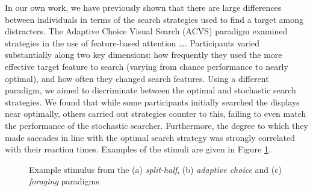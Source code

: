 \documentclass[]{rsos}%
\begin{document}
In our own work, we have previously shown that there are large differences between individuals in terms of the search strategies used to find a target among distracters. The Adaptive Choice Visual Search (ACVS) paradigm  \cite{irons-leber2016} examined strategies in the use of feature-based attention\cite{irons-leber2016,irons-leber2018} \ldots. Participants varied substantially along two key dimensions: how frequently they used the more effective target feature to search (varying from chance performance to nearly optimal), and how often they changed search features. Using a different paradigm\cite{nowakowsak2017}, we aimed to discriminate between the optimal  \cite{najemnik-geisler2008} and stochastic \cite{clarke2016} search strategies. We found that while some participants initially searched the displays near optimally, others carried out strategies counter to this, failing to even match the performance of the stochastic searcher. Furthermore, the degree to which they made saccades in line with the optimal search strategy was strongly correlated with their reaction times. Examples of the stimuli are given in Figure \ref{fig:exampleStimuli}. 

\begin{figure}
\centering
{}
\caption{Example stimulus from the (a) \textit{split-half}, (b) \textit{adaptive choice} and (c) \textit{foraging} paradigms}
\label{fig:exampleStimuli}
\end{figure}
\end{document}

